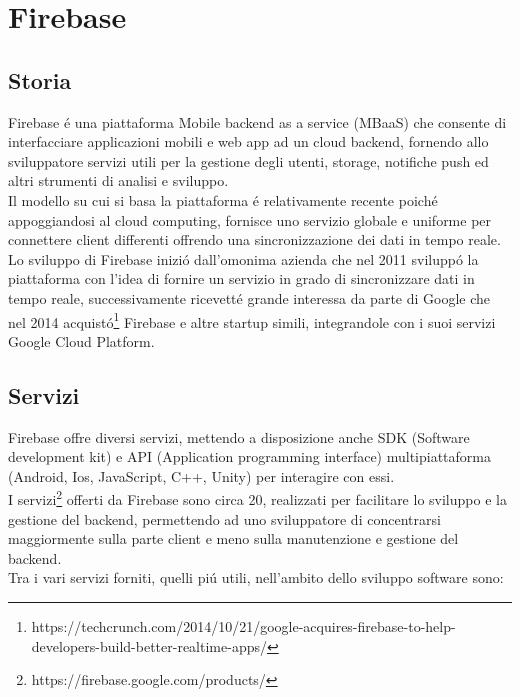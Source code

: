 \chapter{Firebase}                %
\lhead[\fancyplain{}{\bfseries\thepage}]{\fancyplain{}{\bfseries\rightmark}}
\section{Storia}                 %


Firebase \'e una piattaforma Mobile backend as a service (MBaaS) che consente
di interfacciare applicazioni mobili e web app ad un cloud backend, fornendo allo sviluppatore servizi utili per la gestione degli utenti, storage, notifiche push ed altri strumenti di analisi e sviluppo.\\
Il modello su cui si basa la piattaforma \'e relativamente recente poich\'e appoggiandosi al cloud computing, fornisce uno servizio globale e uniforme per connettere client differenti offrendo una sincronizzazione dei dati in tempo reale.\\
Lo sviluppo di Firebase inizi\'o dall'omonima azienda che nel 2011 svilupp\'o la piattaforma con l'idea di fornire un servizio in grado di sincronizzare dati in tempo reale, successivamente ricevett\'e grande interessa da parte di Google che nel 2014 acquist\'o\footnote{https://techcrunch.com/2014/10/21/google-acquires-firebase-to-help-developers-build-better-realtime-apps/} Firebase e altre startup simili, integrandole con i suoi servizi Google Cloud Platform.






\section{Servizi}                 %
Firebase offre diversi servizi, mettendo a disposizione anche SDK (Software development kit) e API (Application programming interface) multipiattaforma (Android, Ios, JavaScript, C++, Unity) per interagire con essi.\\
I servizi\footnote{https://firebase.google.com/products/} offerti da Firebase sono circa 20, realizzati per facilitare lo sviluppo e la gestione del backend, permettendo ad uno sviluppatore di concentrarsi maggiormente sulla parte client e meno sulla manutenzione e gestione del backend.\\
Tra i vari servizi forniti, quelli pi\'u utili, nell'ambito dello sviluppo software sono:


